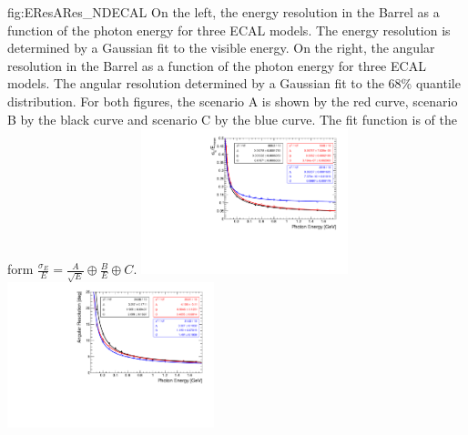 \begin{dunefigure}{fig:EResARes_NDECAL}
{On the left, the energy resolution in the Barrel as a function of the photon energy for three ECAL models. The energy resolution is determined by a Gaussian fit to the visible energy. On the right, the angular resolution in the Barrel as a function of the photon energy for three ECAL models. The angular resolution determined by a Gaussian fit to the 68\% quantile distribution. For both figures, the scenario A is shown by the red curve, scenario B by the black curve and scenario C by the blue curve. The fit function is of the form $\frac{\sigma_{E}}{E} = \frac{A}{\sqrt{E}} \oplus \frac{B}{E} \oplus C$.}
\includegraphics[width=0.45\textwidth]{graphics/Comparison_Setups_EnergyResolution.pdf}
\includegraphics[width=0.45\textwidth]{graphics/Comparison_Setups_AngularResolution.pdf}
\end{dunefigure}

